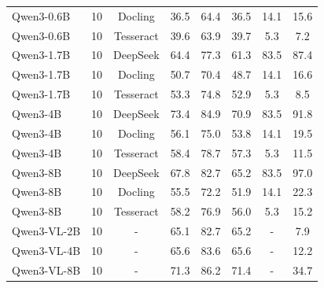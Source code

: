 \begin{table}[ht]
\begin{tabular}{llcccccc}
Qwen3-0.6B & 10 & Docling & 36.5 & 64.4 & 36.5 & 14.1 & 15.6 \\
Qwen3-0.6B & 10 & Tesseract & 39.6 & 63.9 & 39.7 & 5.3 & 7.2 \\
Qwen3-1.7B & 10 & DeepSeek & 64.4 & 77.3 & 61.3 & 83.5 & 87.4 \\
Qwen3-1.7B & 10 & Docling & 50.7 & 70.4 & 48.7 & 14.1 & 16.6 \\
Qwen3-1.7B & 10 & Tesseract & 53.3 & 74.8 & 52.9 & 5.3 & 8.5 \\
Qwen3-4B & 10 & DeepSeek & 73.4 & 84.9 & 70.9 & 83.5 & 91.8 \\
Qwen3-4B & 10 & Docling & 56.1 & 75.0 & 53.8 & 14.1 & 19.5 \\
Qwen3-4B & 10 & Tesseract & 58.4 & 78.7 & 57.3 & 5.3 & 11.5 \\
Qwen3-8B & 10 & DeepSeek & 67.8 & 82.7 & 65.2 & 83.5 & 97.0 \\
Qwen3-8B & 10 & Docling & 55.5 & 72.2 & 51.9 & 14.1 & 22.3 \\
Qwen3-8B & 10 & Tesseract & 58.2 & 76.9 & 56.0 & 5.3 & 15.2 \\
Qwen3-VL-2B & 10 & - & 65.1 & 82.7 & 65.2 & - & 7.9 \\
Qwen3-VL-4B & 10 & - & 65.6 & 83.6 & 65.6 & - & 12.2 \\
Qwen3-VL-8B & 10 & - & 71.3 & 86.2 & 71.4 & - & 34.7 \\
\bottomrule
\end{tabular}
\end{table}
